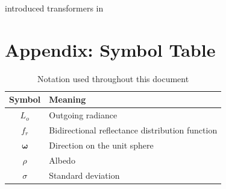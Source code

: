 \documentclass[11pt,a4paper]{article}
\theoremstyle{plain}
\theoremstyle{definition}
\theoremstyle{remark}
\begin{document}

\citet{vaswani2017attention} introduced transformers in \citeyear{vaswani2017attention}




\appendix
\section{Appendix: Symbol Table}
\begin{table}[H]
\centering
{}
\begin{tabular}{cl}
\toprule
\textbf{Symbol} & \textbf{Meaning} \\
\midrule
$L_o$        & Outgoing radiance \\
$f_r$        & Bidirectional reflectance distribution function \\
$\bm{\omega}$& Direction on the unit sphere \\
$\rho$       & Albedo \\
$\sigma$     & Standard deviation \\
\bottomrule
\end{tabular}
\caption{Notation used throughout this document}
\label{tab:symbols}
\end{table}
\end{document}
